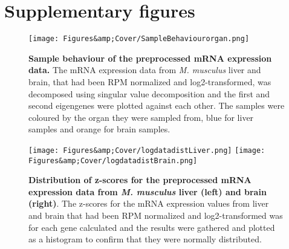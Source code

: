 \chapter{Supplementary figures}
\label{sec:plotsetc}
\vspace{-0.75cm}

\begin{figure}
    \centering
    \texttt{[image: Figures\&amp;Cover/SampleBehaviourorgan.png]}
    \caption{\textbf{Sample behaviour of the preprocessed mRNA expression data.} The mRNA expression data from \textit{M. musculus} liver and brain, that had been \ac{RPM} normalized and log2-transformed, was decomposed using singular value decomposition and the first and second eigengenes were plotted against each other. The samples were coloured by the organ they were sampled from, blue for liver samples and orange for brain samples.}
    \label{fig:SampleBehaviour}
\end{figure}

\begin{figure}
    \centering
    \texttt{[image: Figures\&amp;Cover/logdatadistLiver.png]}
    \texttt{[image: Figures\&amp;Cover/logdatadistBrain.png]}
    \caption{\textbf{Distribution of z-scores for the preprocessed mRNA expression data from \textit{M. musculus} liver (left) and brain (right)}. The z-scores for the mRNA expression values from liver and brain that had been \ac{RPM} normalized and log2-transformed was for each gene calculated and the results were gathered and plotted as a histogram to confirm that they were normally distributed.}
    \label{fig:logdatadist}
\end{figure}

